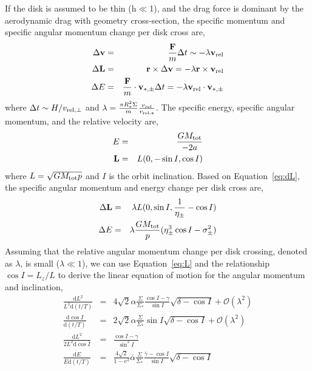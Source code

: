 \documentclass[fleqn,usenatbib]{mnras}
\newcommand{\dd}[0]{\mathrm{d}}
\begin{document}
If the disk is assumed to be thin (h$\ll$1), and the drag force is dominant by the aerodynamic drag with geometry cross-section, the specific momentum and specific angular momentum change per disk cross are,
\begin{eqnarray}
    \Delta\mathbf{v}&=&\frac{\mathbf{F}}{m}\Delta t
    \sim-\lambda \mathbf{v}_{\rm rel}\\
    \Delta \mathbf{L}&=&\mathbf{r}\times \Delta\mathbf{v}=-\lambda \mathbf{r}\times \mathbf{v}_{\rm rel}\label{eq:dL}\\
    \Delta E &=& \frac{\mathbf{F}}{m} \cdot \mathbf{v}_{*,\pm}\Delta t=-\lambda\mathbf{v}_{\rm rel}\cdot \mathbf{v}_{*,\pm} 
\end{eqnarray}
where $\Delta t \sim H/v_{\rm rel,\perp}$ and $\lambda =\frac{\pi R_{*}^2\Sigma}{m}\frac{v_{\rm rel}}{v_{\rm rel,z}}$. The specific energy, specific angular momentum, and the relative velocity are,
\begin{eqnarray}
E &=& \frac{GM_{\rm tot}}{-2a}\\
\mathbf{L}&=&L(0,-\sin I,\cos I)\label{eq:L}
\end{eqnarray}
where $L = \sqrt{GM_{\rm tot}p}$ and $I$ is the orbit inclination. Based on Equation~\ref{eq:dL}, the specific angular momentum and energy change per disk cross are,
\begin{eqnarray}
\Delta \mathbf{L}&=& \lambda L(0,\sin I,\frac{1}{\eta_\pm}-\cos I)\\
\Delta E &=&\lambda\frac{GM_{\rm tot}}{p}(\eta_\pm^3\cos I-\sigma_\pm^2) 
\end{eqnarray}
Assuming that the relative angular momentum change per disk crossing, denoted as $\lambda$, is small ($\lambda \ll 1$), we can use Equation~\ref{eq:L} and the relationship $\cos I = L_z 
/ L$ to derive the linear equation of motion for the angular momentum and inclination,
\begin{eqnarray}
\frac{\dd L^2}{L^2\dd(t/T)} &=& 4\sqrt{2}\alpha\frac{\Sigma}{\Sigma_*}\frac{\cos I - \gamma}{\sin I}\sqrt{ \delta -\cos I} + \mathcal{O}(\lambda^2)\label{eq:dLdt}\\
\frac{\dd \cos I}{\dd(t/T)} &=& 2\sqrt{2}\alpha\frac{\Sigma}{\Sigma_*}{\sin I}\sqrt{ {\delta}-\cos I} + \mathcal{O}(\lambda^2)\label{eq:dIdt}\\
 \frac{\dd L^2}{2L^2\dd\cos I}&=&\frac{\cos I-\gamma}{\sin^2 I}\label{eq:dLdI}\\
 \frac{\dd E}{E\dd(t/T)} &=& \frac{4\sqrt{2}}{1-e^2}\bar{\alpha}\frac{\Sigma}{\Sigma_*}\frac{\bar{\gamma}-\cos I}{\sin I}\sqrt{ \delta -\cos I} 
\end{eqnarray}
\end{document}
